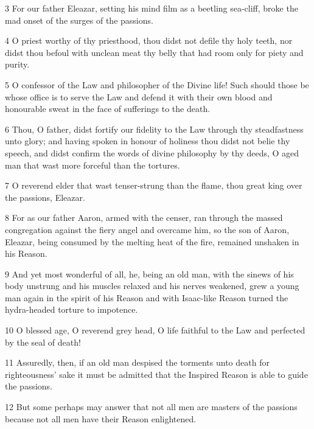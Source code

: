 \par 3 For our father Eleazar, setting his mind film as a beetling sea-cliff, broke the mad onset of the surges of the passions.

\par 4 O priest worthy of thy priesthood, thou didst not defile thy holy teeth, nor didst thou befoul with unclean meat thy belly that had room only for piety and purity.

\par 5 O confessor of the Law and philosopher of the Divine life! Such should those be whose office is to serve the Law and defend it with their own blood and honourable sweat in the face of sufferings to the death.

\par 6 Thou, O father, didst fortify our fidelity to the Law through thy steadfastness unto glory; and having spoken in honour of holiness thou didst not belie thy speech, and didst confirm the words of divine philosophy by thy deeds, O aged man that wast more forceful than the tortures.

\par 7 O reverend elder that wast tenser-strung than the flame, thou great king over the passions, Eleazar.

\par 8 For as our father Aaron, armed with the censer, ran through the massed congregation against the fiery angel and overcame him, so the son of Aaron, Eleazar, being consumed by the melting heat of the fire, remained unshaken in his Reason.

\par 9 And yet most wonderful of all, he, being an old man, with the sinews of his body unstrung and his muscles relaxed and his nerves weakened, grew a young man again in the spirit of his Reason and with Isaac-like Reason turned the hydra-headed torture to impotence.

\par 10 O blessed age, O reverend grey head, O life faithful to the Law and perfected by the seal of death!

\par 11 Assuredly, then, if an old man despised the torments unto death for righteousness' sake it must be admitted that the Inspired Reason is able to guide the passions.

\par 12 But some perhaps may answer that not all men are masters of the passions because not all men have their Reason enlightened.

